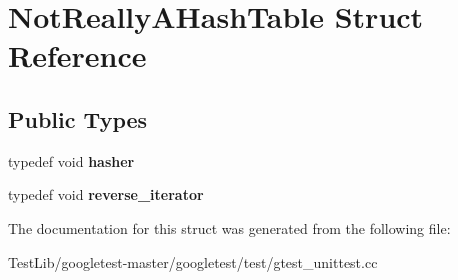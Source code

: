 \hypertarget{structNotReallyAHashTable}{}\section{Not\+Really\+A\+Hash\+Table Struct Reference}
\label{structNotReallyAHashTable}
\subsection*{Public Types}
\begin{DoxyCompactItemize}
\item 
\mbox{\label{structNotReallyAHashTable_a0206bef6150919c8ba5d539d5bf555f7}} 
typedef void {\bfseries hasher}
\item 
\mbox{\label{structNotReallyAHashTable_a8dbee2a2a80768191c736fb57367cfe7}} 
typedef void {\bfseries reverse\+\_\+iterator}
\end{DoxyCompactItemize}


The documentation for this struct was generated from the following file\+:\begin{DoxyCompactItemize}
\item 
Test\+Lib/googletest-\/master/googletest/test/gtest\+\_\+unittest.\+cc\end{DoxyCompactItemize}
